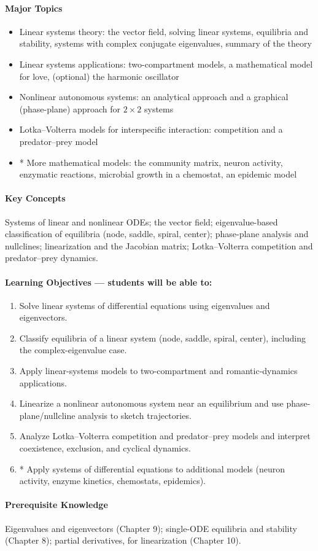 \documentclass[11pt]{article}
\newcommand{\MajorTopics}{\paragraph{Major Topics}}
\newcommand{\KeyConcepts}{\paragraph{Key Concepts}}
\newcommand{\LearnObj}{\paragraph{Learning Objectives --- students will be able to:}}
\newcommand{\PreReq}{\paragraph{Prerequisite Knowledge}}
\begin{document}
\MajorTopics
\begin{itemize}
\item Linear systems theory: the vector field, solving linear systems, equilibria and stability, systems with complex conjugate eigenvalues, summary of the theory
\item Linear systems applications: two-compartment models, a mathematical model for love, (optional) the harmonic oscillator
\item Nonlinear autonomous systems: an analytical approach and a graphical (phase-plane) approach for $2\times2$ systems
\item Lotka--Volterra models for interspecific interaction: competition and a predator--prey model
\item * More mathematical models: the community matrix, neuron activity, enzymatic reactions, microbial growth in a chemostat, an epidemic model
\end{itemize}

\KeyConcepts
Systems of linear and nonlinear ODEs; the vector field; eigenvalue-based
classification of equilibria (node, saddle, spiral, center); phase-plane
analysis and nullclines; linearization and the Jacobian matrix;
Lotka--Volterra competition and predator--prey dynamics.

\LearnObj
\begin{enumerate}
\item Solve linear systems of differential equations using eigenvalues and eigenvectors.
\item Classify equilibria of a linear system (node, saddle, spiral, center), including the complex-eigenvalue case.
\item Apply linear-systems models to two-compartment and romantic-dynamics applications.
\item Linearize a nonlinear autonomous system near an equilibrium and use phase-plane/nullcline analysis to sketch trajectories.
\item Analyze Lotka--Volterra competition and predator--prey models and interpret coexistence, exclusion, and cyclical dynamics.
\item * Apply systems of differential equations to additional models (neuron activity, enzyme kinetics, chemostats, epidemics).
\end{enumerate}

\PreReq Eigenvalues and eigenvectors (Chapter 9); single-ODE equilibria and stability (Chapter 8); partial derivatives, for linearization (Chapter 10).
\end{document}
